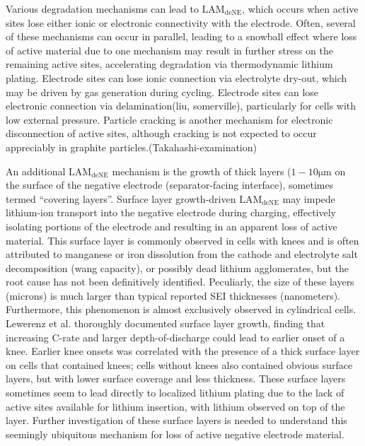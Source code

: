 \documentclass[journal=jpcl, manuscript=article, layout=onecolumn]{achemso}
\begin{document}
Various degradation mechanisms can lead to $\mathrm{LAM_{deNE}}$, which occurs when active sites lose either ionic or electronic connectivity with the electrode.
Often, several of these mechanisms can occur in parallel, leading to a snowball effect where loss of active material due to one mechanism may result in further stress on the remaining active sites, accelerating degradation via thermodynamic lithium plating.
Electrode sites can lose ionic connection via electrolyte dry-out, which may be driven by gas generation during cycling.\cite{mao_calendar_2017, kupper_end--life_2018}
Electrode sites can lose electronic connection via delamination\cite{cannarella_stress_2014, willenberg_high-precision_2020}(liu, somerville), particularly for cells with low external pressure\cite{cannarella_stress_2014}. Particle cracking is another mechanism for electronic disconnection of active sites, although cracking is not expected to occur appreciably in graphite particles.(Takahashi-examination)

An additional $\mathrm{LAM_{deNE}}$ mechanism is the growth of thick layers ($1-10 \mathrm{\mu m}$ on the surface of the negative electrode (separator-facing interface), sometimes termed ``covering layers''\cite{lewerenz_post-mortem_2017, lewerenz_systematic_2017, willenberg_development_2020}.
Surface layer growth-driven $\mathrm{LAM_{deNE}}$ may impede lithium-ion transport into the negative electrode during charging, effectively isolating portions of the electrode and resulting in an apparent loss of active material. This surface layer is commonly observed in cells with knees and is often attributed to manganese or iron dissolution from the cathode and electrolyte salt decomposition \cite{lewerenz_post-mortem_2017,lewerenz_systematic_2017,zhu_investigation_2021,stiaszny_electrochemical_2014,rahe_nanoscale_2019,keil_linear_2019,sarasketa-zabala_understanding_2015, li_degradation_2016, klett_non-uniform_2014, klett_uneven_2015, willenberg_high-precision_2020}(wang capacity), or possibly dead lithium agglomerates\cite{schindler_fast_2018}, but the root cause has not been definitively identified. Peculiarly, the size of these layers (microns) is much larger than typical reported SEI thicknesses (nanometers)\cite{peled_reviewsei_2017}. Furthermore, this phenomenon is almost exclusively observed in cylindrical cells.
Lewerenz et al.\cite{lewerenz_post-mortem_2017,lewerenz_systematic_2017} thoroughly documented surface layer growth, finding that increasing C-rate and larger depth-of-discharge could lead to earlier onset of a knee. Earlier knee onsets was correlated with the presence of a thick surface layer on cells that contained knees; cells without knees also contained obvious surface layers, but with lower surface coverage and less thickness. These surface layers sometimes seem to lead directly to localized lithium plating due to the lack of active sites available for lithium insertion, with lithium observed on top of the layer.\cite{zhu_investigation_2021}
Further investigation of these surface layers is needed to understand this seemingly ubiquitous mechanism for loss of active negative electrode material.
\end{document}
